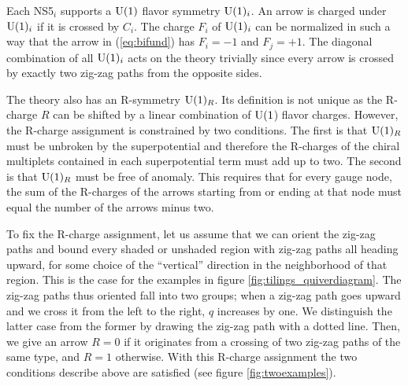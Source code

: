 Each NS5$_{i}$ supports a $\mathrm{U}(1)$ flavor symmetry $\mathrm{U}(1)_{i}$. An
arrow is charged under $\mathrm{U}(1)_{i}$ if it is crossed by $C_{i}$. The
charge $F_{i}$ of $\mathrm{U}(1)_{i}$ can be normalized in such a way that
the arrow in (\ref{eq:bifund}) has $F_{i}=-1$ and $F_{j}=+1$. The
diagonal combination of all $\mathrm{U}(1)_{i}$ acts on the theory trivially
since every arrow is crossed by exactly two zig-zag paths from the
opposite sides.

The theory also has an R-symmetry $\mathrm{U}(1)_{R}$. Its definition is not
unique as the R-charge $R$ can be shifted by a linear combination
of $\mathrm{U}(1$) flavor charges. However, the R-charge assignment is constrained
by two conditions. The first is that $\mathrm{U}(1)_{R}$ must be unbroken
by the superpotential and therefore the R-charges of the chiral multiplets
contained in each superpotential term must add up to two. The second
is that $\mathrm{U}(1)_{R}$ must be free of anomaly. This requires that for
every gauge node, the sum of the R-charges of the arrows starting
from or ending at that node must equal the number of the arrows minus
two.

To fix the R-charge assignment, let us assume that we can orient the
zig-zag paths and bound every shaded or unshaded region with zig-zag
paths all heading upward, for some choice of the ``vertical'' direction
in the neighborhood of that region. This is the case for the examples
in figure \ref{fig:tilings_quiverdiagram}. The zig-zag paths thus oriented fall into two groups; when
a zig-zag path goes upward and we cross it from the left to the right,
$q$ increases by one. We distinguish the latter case from the former
by drawing the zig-zag path with a dotted line. Then, we give an arrow
$R=0$ if it originates from a crossing of two zig-zag paths of the
same type, and $R=1$ otherwise. With this R-charge assignment the
two conditions describe above are satisfied (see figure \ref{fig:twoexamples}).


